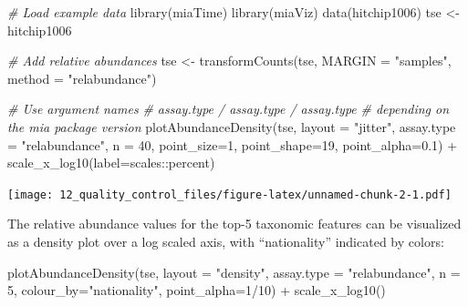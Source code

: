 \documentclass[
]{book}
\newenvironment{Shaded}{\begin{snugshade}}{\end{snugshade}}
\newcommand{\AttributeTok}[1]{\textcolor[rgb]{0.77,0.63,0.00}{#1}}
\newcommand{\CommentTok}[1]{\textcolor[rgb]{0.56,0.35,0.01}{\textit{#1}}}
\newcommand{\DecValTok}[1]{\textcolor[rgb]{0.00,0.00,0.81}{#1}}
\newcommand{\FloatTok}[1]{\textcolor[rgb]{0.00,0.00,0.81}{#1}}
\newcommand{\FunctionTok}[1]{\textcolor[rgb]{0.00,0.00,0.00}{#1}}
\newcommand{\NormalTok}[1]{#1}
\newcommand{\OtherTok}[1]{\textcolor[rgb]{0.56,0.35,0.01}{#1}}
\newcommand{\SpecialCharTok}[1]{\textcolor[rgb]{0.00,0.00,0.00}{#1}}
\newcommand{\StringTok}[1]{\textcolor[rgb]{0.31,0.60,0.02}{#1}}
\begin{document}
\begin{Shaded}
\begin{Highlighting}[]
\CommentTok{\# Load example data}
\FunctionTok{library}\NormalTok{(miaTime)}
\FunctionTok{library}\NormalTok{(miaViz)}
\FunctionTok{data}\NormalTok{(hitchip1006)}
\NormalTok{tse }\OtherTok{\textless{}{-}}\NormalTok{ hitchip1006}

\CommentTok{\# Add relative abundances}
\NormalTok{tse }\OtherTok{\textless{}{-}} \FunctionTok{transformCounts}\NormalTok{(tse, }\AttributeTok{MARGIN =} \StringTok{"samples"}\NormalTok{, }\AttributeTok{method =} \StringTok{"relabundance"}\NormalTok{)}

\CommentTok{\# Use argument names}
\CommentTok{\# assay.type / assay.type / assay.type}
\CommentTok{\# depending on the mia package version}
\FunctionTok{plotAbundanceDensity}\NormalTok{(tse, }\AttributeTok{layout =} \StringTok{"jitter"}\NormalTok{, }\AttributeTok{assay.type =} \StringTok{"relabundance"}\NormalTok{,}
                     \AttributeTok{n =} \DecValTok{40}\NormalTok{, }\AttributeTok{point\_size=}\DecValTok{1}\NormalTok{, }\AttributeTok{point\_shape=}\DecValTok{19}\NormalTok{, }\AttributeTok{point\_alpha=}\FloatTok{0.1}\NormalTok{) }\SpecialCharTok{+} 
                     \FunctionTok{scale\_x\_log10}\NormalTok{(}\AttributeTok{label=}\NormalTok{scales}\SpecialCharTok{::}\NormalTok{percent)}
\end{Highlighting}
\end{Shaded}

\texttt{[image: 12\_quality\_control\_files/figure-latex/unnamed-chunk-2-1.pdf]}

The relative abundance values for the top-5 taxonomic features can be
visualized as a density plot over a log scaled axis, with
``nationality'' indicated by colors:

\begin{Shaded}
\begin{Highlighting}[]
\FunctionTok{plotAbundanceDensity}\NormalTok{(tse, }\AttributeTok{layout =} \StringTok{"density"}\NormalTok{, }\AttributeTok{assay.type =} \StringTok{"relabundance"}\NormalTok{,}
                     \AttributeTok{n =} \DecValTok{5}\NormalTok{, }\AttributeTok{colour\_by=}\StringTok{"nationality"}\NormalTok{, }\AttributeTok{point\_alpha=}\DecValTok{1}\SpecialCharTok{/}\DecValTok{10}\NormalTok{) }\SpecialCharTok{+}
    \FunctionTok{scale\_x\_log10}\NormalTok{()}
\end{Highlighting}
\end{Shaded}
\end{document}
